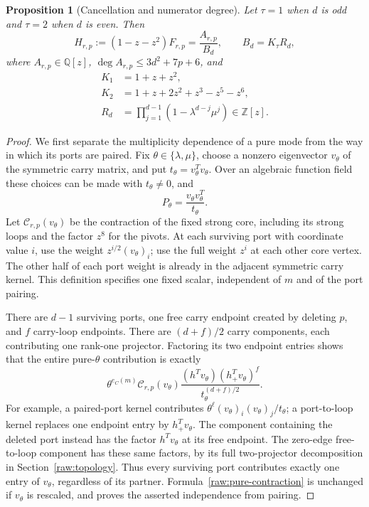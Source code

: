 \documentclass[11pt]{amsart}
\newtheorem{proposition}[theorem]{Proposition}
\theoremstyle{definition}
\theoremstyle{remark}
\numberwithin{equation}{section}
\begin{document}
\begin{proposition}[Cancellation and numerator degree]\label{raw:cancellation}
Let $\tau=1$ when $d$ is odd and $\tau=2$ when $d$ is even.  Then
\begin{equation}\label{raw:correction}
 H_{r,p}:=(1-z-z^2)F_{r,p}=\frac{A_{r,p}}{B_d},\qquad
 B_d=K_\tau R_d,
\end{equation}
where $A_{r,p}\in\mathbb Q[z]$, $\deg A_{r,p}\le3d^2+7p+6$, and
\begin{align*}
 K_1&=1+z+z^2,\\
 K_2&=1+z+2z^2+z^3-z^5-z^6,\\
 R_d&=\prod_{j=1}^{d-1}(1-\lambda^{d-j}\mu^j)\in\mathbb Z[z].
\end{align*}
\end{proposition}
\begin{proof}
We first separate the multiplicity dependence of a pure mode from the
way in which its ports are paired.  Fix $\theta\in\{\lambda,\mu\}$,
choose a nonzero eigenvector $v_\theta$ of the symmetric carry matrix,
and put $t_\theta=v_\theta^Tv_\theta$.  Over an algebraic function field
these choices can be made with $t_\theta\ne0$, and
\[
 P_\theta=\frac{v_\theta v_\theta^T}{t_\theta}.
\]
Let $\mathcal C_{r,p}(v_\theta)$ be the contraction of the fixed strong
core, including its strong loops and the factor $z^8$ for the pivots.
At each surviving port with coordinate value $i$, use the weight
$z^{i/2}(v_\theta)_i$; use the full weight $z^i$ at each other core
vertex.  The other half of each port weight is already in the adjacent
symmetric carry kernel.  This definition specifies one fixed scalar,
independent of $m$ and of the port pairing.

There are $d-1$ surviving ports, one free carry endpoint created by
deleting $p$, and $f$ carry-loop endpoints.  There are
$(d+f)/2$ carry components, each contributing one rank-one
projector.  Factoring its two endpoint entries shows that the entire
pure-$\theta$ contribution is exactly
\begin{equation}\label{raw:pure-contraction}
 \theta^{e_C(m)}\mathcal C_{r,p}(v_\theta)
 \frac{(h^Tv_\theta)(h_+^Tv_\theta)^f}
      {t_\theta^{(d+f)/2}}.
\end{equation}
For example, a paired-port kernel contributes
$\theta^\ell(v_\theta)_i(v_\theta)_j/t_\theta$; a port-to-loop
kernel replaces one endpoint entry by $h_+^Tv_\theta$.  The component
containing the deleted port instead has the factor $h^Tv_\theta$ at
its free endpoint.  The zero-edge free-to-loop component has these
same factors, by its full two-projector decomposition in
Section~\ref{raw:topology}.  Thus every surviving port contributes
exactly one entry of $v_\theta$, regardless of its partner.
Formula~\eqref{raw:pure-contraction} is unchanged if $v_\theta$ is
rescaled, and proves the asserted independence from pairing.


\end{proof}
\end{document}

